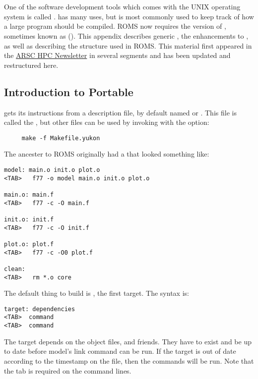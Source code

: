 \section{}
\label{Gmake}
One of the software development tools which comes with the UNIX
operating system is called .  has many uses,
but is most commonly used to keep track of how a large program
should be compiled. ROMS now requires the  version of 
, sometimes known as  (\cite{GMAKE}).
This appendix describes generic , the 
enhancements to , as well as describing the
 structure used in ROMS. This material first
appeared in the \href{http://www.arsc.edu/support/news/HPCnews.shtml}{ARSC
HPC Newsletter} in several segments and has been updated and restructured
here.

\subsection{Introduction to Portable }

 gets its instructions from a description file, by default named
 or . This file is called the
, but other files
can be used by invoking  with the  option:
\begin{verbatim}
     make -f Makefile.yukon
\end{verbatim}

The ancester to ROMS originally had a  that looked
something like:
\begin{verbatim}
model: main.o init.o plot.o
<TAB>   f77 -o model main.o init.o plot.o

main.o: main.f
<TAB>   f77 -c -O main.f

init.o: init.f
<TAB>   f77 -c -O init.f

plot.o: plot.f
<TAB>   f77 -c -O0 plot.f

clean:
<TAB>   rm *.o core
\end{verbatim}
The default thing to build is , the first target. The syntax
is:
\begin{verbatim}
target: dependencies
<TAB>  command
<TAB>  command
\end{verbatim}
The target  depends on the object files, 
and friends. They have to exist and be up to date before model's link
command can be run. If the target is out of date according to the
timestamp on the file, then the commands will
be run. Note that the tab is required on the command lines.

